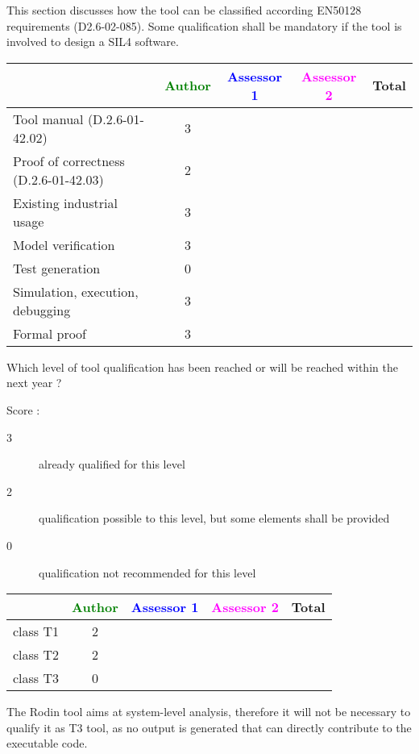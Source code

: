 This section discusses how the tool can be classified according EN50128 requirements (D2.6-02-085). Some qualification shall be mandatory  if the tool is involved to design a SIL4 software.


\begin{tabular}{|l | c | c | c | c|}
\hline
& \textcolor{green}{Author} & \textcolor{blue}{Assessor 1} & \textcolor{magenta}{Assessor 2} & Total \\
\hline 
Tool manual (D.2.6-01-42.02) & 3 & & &  \\
\hline
Proof of correctness (D.2.6-01-42.03)   & 2 & & & \\
\hline
Existing industrial  usage  & 3 & & & \\
\hline
Model verification & 3 & & & \\
\hline
Test generation & 0 & & & \\
\hline
Simulation, execution, debugging & 3 & & & \\
\hline
Formal proof & 3 & & & \\
\hline
\end{tabular}


Which level of tool qualification has been reached or will be reached within the next year ?

Score :
\begin{description}
\item[3] already qualified for this level
\item[2] qualification possible to this level, but some elements shall be provided
\item[0] qualification not recommended for this level
\end{description}


\begin{tabular}{|l | c | c | c | c|}
\hline
& \textcolor{green}{Author} & \textcolor{blue}{Assessor 1} & \textcolor{magenta}{Assessor 2} & Total \\
\hline 
class T1 & 2 & & &  \\
\hline
class T2  & 2 & & & \\
\hline
class T3  & 0 & & & \\
\hline
\end{tabular}

\begin{author_comment}
  The Rodin tool aims at system-level analysis, therefore it will not be
  necessary to qualify it as T3 tool, as no output is generated that can
  directly contribute to the executable code.
\end{author_comment}


